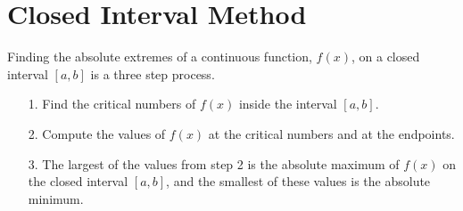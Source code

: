 \documentclass[handout]{ximera}
\begin{document}
\section{Closed Interval Method}
Finding the absolute extremes of a
continuous function, $f(x)$, on a closed interval $[a,b]$ is a three 
step process.
\begin{enumerate}
\item[1.] Find the critical numbers of $f(x)$ inside the interval $[a, b]$.
\item[2.] Compute the values of $f(x)$ at the critical numbers and 
at the endpoints.
\item[3.] The largest of the values from step 2 is the absolute 
maximum of $f(x)$ on the closed interval $[a,b]$, and the smallest 
of these values is the absolute minimum.
\end{enumerate}
\end{document}
